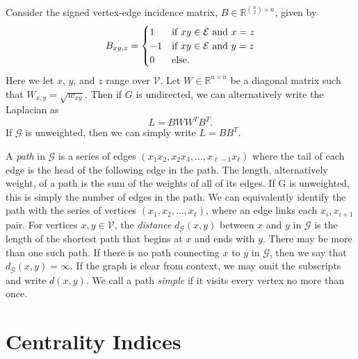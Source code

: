 \documentclass{report}
\begin{document}
Consider the signed vertex-edge incidence matrix, $B \in \mathbb{R}^{{n \choose 2} \times n}$, given by
%
\begin{equation} \label{eq:veim}
B_{xy,z} = 
\begin{cases}
1 & \textnormal{if $xy \in \mathcal{E}$ and $x=z$} \\
-1 & \textnormal{if $xy \in \mathcal{E}$ and $y=z$} \\
0 & \textnormal{else}.
\end{cases}
\end{equation}
%
Here we let $x$, $y$, and $z$ range over $\mathcal{V}$. 
Let $W \in \mathbb{R}^{n \times n}$ be a diagonal matrix such that $W_{x,y} = \sqrt{w_{xy}}$.
Then if $G$ is undirected, we can alternatively write the Laplacian as 
%
\begin{equation} \label{eq:laplacian}
L = BWW^TB^T.
\end{equation}
%
If $\mathcal{G}$ is unweighted, then we can simply write $L = BB^T$. 

A \emph{path} in $\mathcal{G}$ is a series of edges $(x_1 x_2, x_2 x_3, \dots, x_{\ell -1} x_\ell)$ where the tail of each edge is the head of the following edge in the path. 
The length, alternatively weight, of a path is the sum of the weights of all of its edges.
If G is unweighted, this is simply the number of edges in the path.
We can equivalently identify the path with the series of vertices $(x_1, x_2, \dots, x_\ell)$, where an edge links each $x_i, x_{i+1}$ pair.
For vertices $x,y \in \mathcal{V}$, the \emph{distance} $d_\mathcal{G}(x,y)$ between $x$ and $y$ in $\mathcal{G}$ is the length of the shortest path that begins at $x$ and ends with $y$. 
There may be more than one such path. 
If there is no path connecting $x$ to $y$ in $\mathcal{G}$, then we say that $d_\mathcal{G}(x,y) = \infty$. 
If the graph is clear from context, we may omit the subscripts and write $d(x,y)$.
We call a path \emph{simple} if it visits every vertex no more than once. 


\section{Centrality Indices} \label{sec:centrality}
\end{document}
